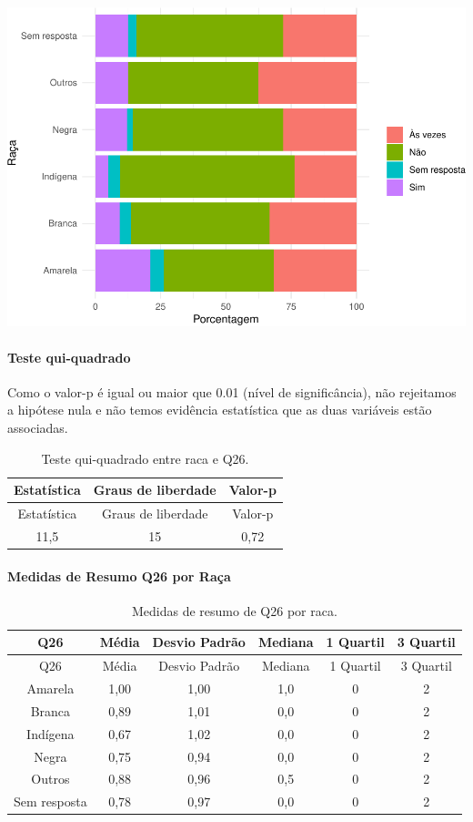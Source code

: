 \documentclass[]{article}
\let\oldparagraph\paragraph
\renewcommand{\paragraph}[1]{\oldparagraph{#1}\mbox{}}
\begin{document}
\begin{center}\includegraphics[width=0.75\linewidth]{relatorio_covid19_files/figure-latex/unnamed-chunk-751-1} \end{center}

\hypertarget{teste-qui-quadrado-65}{%
\paragraph{Teste qui-quadrado}\label{teste-qui-quadrado-65}}

Como o valor-p é igual ou maior que 0.01 (nível de significância), não rejeitamos a hipótese nula e não temos evidência estatística que as duas variáveis estão associadas.

\begin{longtable}[]{@{}ccc@{}}
\caption{\label{tab:unnamed-chunk-753}Teste qui-quadrado entre raca e Q26.}\tabularnewline
\toprule
Estatística & Graus de liberdade & Valor-p\tabularnewline
\midrule
\endfirsthead
\toprule
Estatística & Graus de liberdade & Valor-p\tabularnewline
\midrule
\endhead
11,5 & 15 & 0,72\tabularnewline
\bottomrule
\end{longtable}

\cleardoublepage

\hypertarget{medidas-de-resumo-q26-por-rauxe7a}{%
\paragraph{Medidas de Resumo Q26 por Raça}\label{medidas-de-resumo-q26-por-rauxe7a}}

\begin{longtable}[]{@{}cccccc@{}}
\caption{\label{tab:unnamed-chunk-754}Medidas de resumo de Q26 por raca.}\tabularnewline
\toprule
Q26 & Média & Desvio Padrão & Mediana & 1 Quartil & 3 Quartil\tabularnewline
\midrule
\endfirsthead
\toprule
Q26 & Média & Desvio Padrão & Mediana & 1 Quartil & 3 Quartil\tabularnewline
\midrule
\endhead
Amarela & 1,00 & 1,00 & 1,0 & 0 & 2\tabularnewline
Branca & 0,89 & 1,01 & 0,0 & 0 & 2\tabularnewline
Indígena & 0,67 & 1,02 & 0,0 & 0 & 2\tabularnewline
Negra & 0,75 & 0,94 & 0,0 & 0 & 2\tabularnewline
Outros & 0,88 & 0,96 & 0,5 & 0 & 2\tabularnewline
Sem resposta & 0,78 & 0,97 & 0,0 & 0 & 2\tabularnewline
\bottomrule
\end{longtable}
\end{document}
